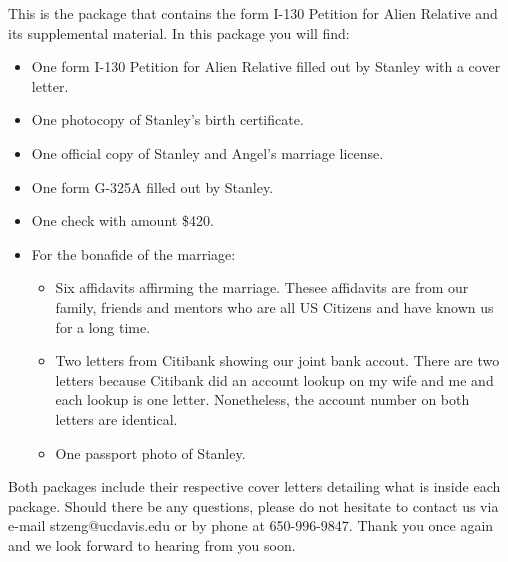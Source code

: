 \documentclass[stdletter]{newlfm}
\begin{document}
 
\begin{newlfm}
This is the package that contains the form I-130 Petition for Alien Relative and its supplemental material.  In this package you will find:
\begin{itemize}

\item One form I-130 Petition for Alien Relative filled out by Stanley with a cover letter.
\item One photocopy of Stanley's birth certificate.
\item One official copy of Stanley and Angel's marriage license.
\item One form G-325A filled out by Stanley.
\item One check with amount \$420.
\item For the bonafide of the marriage:
\begin{itemize}
\item Six affidavits affirming the marriage.  Thesee affidavits are from our family, friends and mentors who are all US Citizens and have known us for a long time.
\item Two letters from Citibank showing our joint bank accout.  There are two letters because Citibank did an account lookup on my wife and me and each lookup is one letter.  Nonetheless, the account number on both letters are identical.
\item One passport photo of Stanley.
\end{itemize}

\end{itemize}

Both packages include their respective cover letters detailing what is inside each package.  Should there be any questions, please do not hesitate to contact us via e-mail stzeng@ucdavis.edu or by phone at 650-996-9847.  Thank you once again and we look forward to hearing from you soon.
\end{newlfm}
\end{document}
